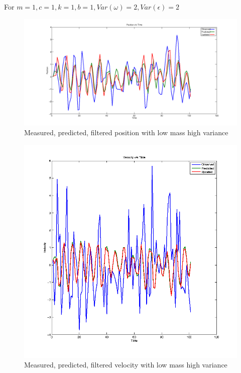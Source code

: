 \documentclass[12pt,english]{article}
\begin{document}
For $m=1,c=1,k=1,b=1, Var(\omega)=2, Var(\epsilon)=2$


\begin{figure}
    \includegraphics[width=\linewidth]{kalman-position-m1h}
    \caption{Measured, predicted, filtered position with low mass high variance}
\end{figure}

\begin{figure}
    \includegraphics[width=\linewidth]{kalman-velocity-m1h}
    \caption{Measured, predicted, filtered velocity with low mass high variance}
\end{figure}
\end{document}
